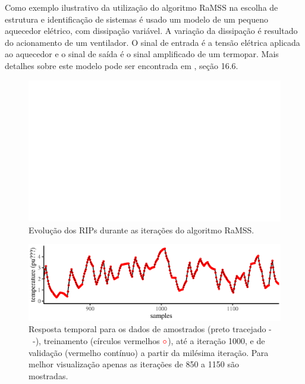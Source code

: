 \begin{exmp}
  \label{ex:varHeater}
  Como exemplo ilustrativo da utilização do algoritmo RaMSS na escolha de estrutura e identificação de sistemas é usado um modelo de um pequeno aquecedor elétrico, com dissipação variável. A variação da dissipação é resultado do acionamento de um ventilador. O sinal de entrada é a tensão elétrica aplicada ao aquecedor e o sinal de saída é o sinal amplificado de um termopar. Mais detalhes sobre este modelo pode ser encontrada em \citep{aguirre2015}, seção 16.6.

  \begin{figure}[H]
    \centering
    \includegraphics{./Figs/s.heater.var.dissip_RIPs.eps}
    \caption{Evolução dos RIPs durante as iterações do algoritmo RaMSS. 
    }
    \label{fig:RIPs1}
  \end{figure}

  \begin{figure}[H]
    \centering
    \includegraphics{./Figs/s.heater.var.dissip_train_val_data.eps}
    \caption{Resposta temporal para os dados de amostrados (preto tracejado -\ -), treinamento (círculos vermelhos $\color{red} \circ$), até a iteração 1000, e de validação (vermelho contínuo) a partir da milésima iteração. Para melhor visualização apenas as iterações de 850 a 1150 são mostradas.  }
    \label{fig:}
  \end{figure}

\end{exmp}

